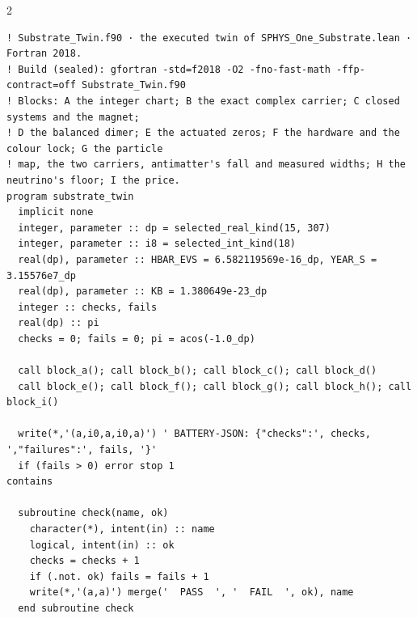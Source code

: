 \documentclass[10pt]{article}
\begin{document}
\begin{multicols}{2}
\begin{Verbatim}[fontsize=\fontsize{6.2}{7.2}\selectfont,breaklines,breakanywhere,breaksymbolleft={}]
! Substrate_Twin.f90 · the executed twin of SPHYS_One_Substrate.lean · Fortran 2018.
! Build (sealed): gfortran -std=f2018 -O2 -fno-fast-math -ffp-contract=off Substrate_Twin.f90
! Blocks: A the integer chart; B the exact complex carrier; C closed systems and the magnet;
! D the balanced dimer; E the actuated zeros; F the hardware and the colour lock; G the particle
! map, the two carriers, antimatter's fall and measured widths; H the neutrino's floor; I the price.
program substrate_twin
  implicit none
  integer, parameter :: dp = selected_real_kind(15, 307)
  integer, parameter :: i8 = selected_int_kind(18)
  real(dp), parameter :: HBAR_EVS = 6.582119569e-16_dp, YEAR_S = 3.15576e7_dp
  real(dp), parameter :: KB = 1.380649e-23_dp
  integer :: checks, fails
  real(dp) :: pi
  checks = 0; fails = 0; pi = acos(-1.0_dp)

  call block_a(); call block_b(); call block_c(); call block_d()
  call block_e(); call block_f(); call block_g(); call block_h(); call block_i()

  write(*,'(a,i0,a,i0,a)') ' BATTERY-JSON: {"checks":', checks, ',"failures":', fails, '}'
  if (fails > 0) error stop 1
contains

  subroutine check(name, ok)
    character(*), intent(in) :: name
    logical, intent(in) :: ok
    checks = checks + 1
    if (.not. ok) fails = fails + 1
    write(*,'(a,a)') merge('  PASS  ', '  FAIL  ', ok), name
  end subroutine check


\end{Verbatim}
\end{multicols}
\end{document}
